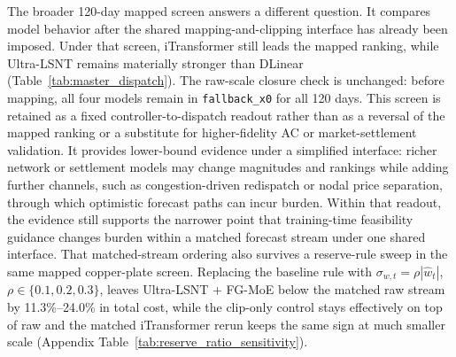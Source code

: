 \documentclass[review,1p,times]{elsarticle}
\begin{document}
The broader 120-day mapped screen answers a different question. It compares model behavior after the shared mapping-and-clipping interface has already been imposed. Under that screen, iTransformer still leads the mapped ranking, while Ultra-LSNT remains materially stronger than DLinear (Table~\ref{tab:master_dispatch}). The raw-scale closure check is unchanged: before mapping, all four models remain in \texttt{fallback\_x0} for all 120 days. This screen is retained as a fixed controller-to-dispatch readout rather than as a reversal of the mapped ranking or a substitute for higher-fidelity AC or market-settlement validation. It provides lower-bound evidence under a simplified interface: richer network or settlement models may change magnitudes and rankings while adding further channels, such as congestion-driven redispatch or nodal price separation, through which optimistic forecast paths can incur burden. Within that readout, the evidence still supports the narrower point that training-time feasibility guidance changes burden within a matched forecast stream under one shared interface.
That matched-stream ordering also survives a reserve-rule sweep in the same mapped copper-plate screen. Replacing the baseline rule with $\sigma_{w,t}=\rho|\hat{w}_t|$, $\rho\in\{0.1,0.2,0.3\}$, leaves Ultra-LSNT + FG-MoE below the matched raw stream by 11.3\%--24.0\% in total cost, while the clip-only control stays effectively on top of raw and the matched iTransformer rerun keeps the same sign at much smaller scale (Appendix Table~\ref{tab:reserve_ratio_sensitivity}).
\end{document}
